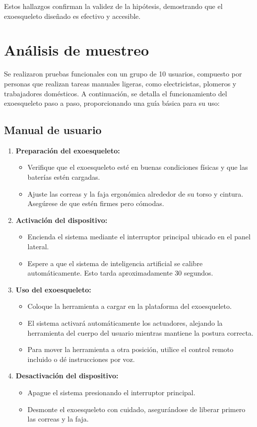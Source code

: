 Estos hallazgos confirman la validez de la hipótesis, demostrando que el exoesqueleto diseñado es efectivo y accesible.

\section{Análisis de muestreo}
Se realizaron pruebas funcionales con un grupo de 10 usuarios, compuesto por personas que realizan tareas manuales ligeras, como electricistas, plomeros y trabajadores domésticos. A continuación, se detalla el funcionamiento del exoesqueleto paso a paso, proporcionando una guía básica para su uso:

\subsection{Manual de usuario}
\begin{enumerate}
    \item \textbf{Preparación del exoesqueleto:}
    \begin{itemize}
        \item Verifique que el exoesqueleto esté en buenas condiciones físicas y que las baterías estén cargadas.
        \item Ajuste las correas y la faja ergonómica alrededor de su torso y cintura. Asegúrese de que estén firmes pero cómodas.
    \end{itemize}
    \item \textbf{Activación del dispositivo:}
    \begin{itemize}
        \item Encienda el sistema mediante el interruptor principal ubicado en el panel lateral.
        \item Espere a que el sistema de inteligencia artificial se calibre automáticamente. Esto tarda aproximadamente 30 segundos.
    \end{itemize}
    \item \textbf{Uso del exoesqueleto:}
    \begin{itemize}
        \item Coloque la herramienta a cargar en la plataforma del exoesqueleto.
        \item El sistema activará automáticamente los actuadores, alejando la herramienta del cuerpo del usuario mientras mantiene la postura correcta.
        \item Para mover la herramienta a otra posición, utilice el control remoto incluido o dé instrucciones por voz.
    \end{itemize}
    \item \textbf{Desactivación del dispositivo:}
    \begin{itemize}
        \item Apague el sistema presionando el interruptor principal.
        \item Desmonte el exoesqueleto con cuidado, asegurándose de liberar primero las correas y la faja.
    \end{itemize}
\end{enumerate}

